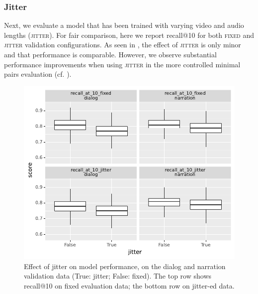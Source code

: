 \subsubsection{Jitter}
Next, we evaluate a model that has been trained with varying video and audio 
lengths (\textsc{jitter}). For fair comparison, here we report recall@10 for both 
\textsc{fixed} and \textsc{jitter} validation configurations.
As seen in , the effect of \textsc{jitter} is only
minor and that performance is comparable.
However, we observe 
substantial performance improvements when using \textsc{jitter} in the more 
controlled minimal pairs evaluation (cf. ).
\begin{figure}[htb]
	\centering
	\includegraphics[width=\columnwidth]{results/ablations/jitter.pdf}
	\caption{Effect of jitter on model performance, on the dialog
          and narration validation data (True: jitter; False:
          fixed). The top row shows recall@10 on {\sc fixed}
          evaluation data; the bottom row on {\sc jitter}-ed data.}
	\label{fig:jitter}
\end{figure}



